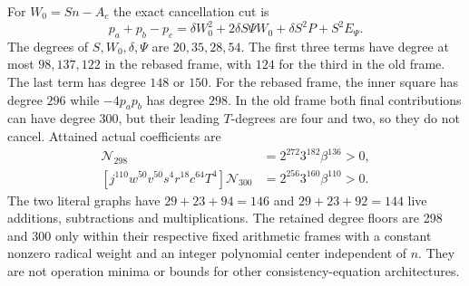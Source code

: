 For $W_0=Sn-A_c$ the exact cancellation cut is
\[
 p_a+p_b-p_c=\delta W_0^2+2\delta S\Psi W_0+
 \delta S^2P+S^2E_\Psi.
\]
The degrees of $S,W_0,\delta,\Psi$ are $20,35,28,54$.
The first three terms have degree at most $98,137,122$ in the rebased
frame, with $124$ for the third in the old frame. The last term has
degree $148$ or $150$. For the rebased frame, the inner square has
degree $296$ while $-4p_ap_b$ has degree $298$. In the old frame
both final contributions can have degree $300$, but their leading
$T$-degrees are four and two, so they do not cancel. Attained actual
coefficients are
\begin{align*}
 [j^{136}w^{46}v^{50}z^6s^6r^{12}c^{40}T^2]\mathcal N_{298}
 &=2^{272}3^{182}\beta^{136}>0,\\
 [j^{110}w^{50}v^{50}s^4r^{18}c^{64}T^4]\mathcal N_{300}
 &=2^{256}3^{160}\beta^{110}>0.
\end{align*}
The two literal graphs have $29+23+94=146$ and
$29+23+92=144$ live additions, subtractions and multiplications.
The retained degree floors are 298 and 300 only within their respective
fixed arithmetic frames with a constant nonzero radical weight and an
integer polynomial center independent of $n$. They are not operation
minima or bounds for other consistency-equation architectures.
